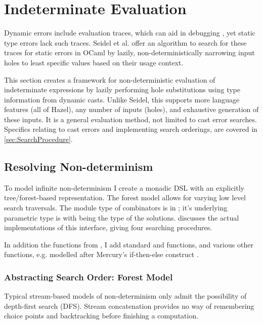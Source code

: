 \section{Indeterminate Evaluation}\label{sec:IndetEval}
Dynamic errors include evaluation traces, which can aid in debugging \cite{TraceVisualisation}, yet static type errors lack such traces. Seidel et al. \cite{SearchProc} offer an algorithm  to search for these traces for static errors in OCaml by lazily, non-deterministically narrowing input holes to least specific values based on their usage context. 

This section creates a framework for non-deterministic evaluation of indeterminate expressions by lazily performing hole substitutions using type information from dynamic casts. Unlike Seidel, this supports more language features (all of Hazel), any number of inputs (holes), and exhaustive generation of these inputs. It is a general evaluation method, not limited to cast error searches. Specifics relating to cast errors and implementing search orderings, are covered in \cref{sec:SearchProcedure}.

\subsection{Resolving Non-determinism}
\label{sec:ResolvingNondeterminism}
To model infinite non-determinism I create a monadic DSL with an explicitly tree/forest-based representation. The forest model allows for varying low level search traversals. The module type of combinators is in ; it's underlying parametric type is  with  being the type of the solutions.  discusses the actual implementations of this interface, giving four searching procedures.


In addition the functions from , I add standard  and  functions, and various other functions, e.g.  modelled after Mercury's if-then-else construct \cite{Mercury}.

\subsubsection{Abstracting Search Order: Forest Model}
Typical stream-based models of non-determinism \cite{ListOfSuccess} only admit the possibility of depth-first search (DFS). Stream concatenation provides no way of remembering choice points and backtracking before finishing a computation. 

